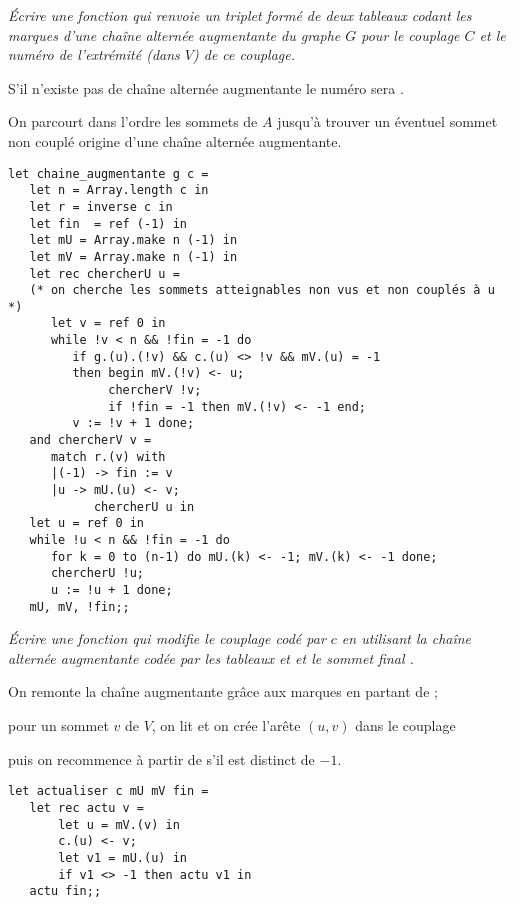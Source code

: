 \begin{Exercise}[title=]\it
Écrire une fonction  qui renvoie un triplet formé de deux tableaux codant les marques d'une chaîne alternée augmentante du graphe $G$ pour le couplage $C$ et le numéro de l'extrémité (dans $V$) de ce couplage.

S'il n'existe pas de chaîne alternée augmentante le numéro sera .
\end{Exercise}
\begin{Answer}
On parcourt dans l'ordre les sommets de $A$ jusqu'à trouver un éventuel sommet non couplé origine d'une chaîne alternée augmentante. 

\begin{lstlisting}
let chaine_augmentante g c =
   let n = Array.length c in
   let r = inverse c in
   let fin  = ref (-1) in
   let mU = Array.make n (-1) in
   let mV = Array.make n (-1) in
   let rec chercherU u =
   (* on cherche les sommets atteignables non vus et non couplés à u *)
      let v = ref 0 in
      while !v < n && !fin = -1 do         
         if g.(u).(!v) && c.(u) <> !v && mV.(u) = -1 
         then begin mV.(!v) <- u;
              chercherV !v;
              if !fin = -1 then mV.(!v) <- -1 end;
         v := !v + 1 done;
   and chercherV v = 
      match r.(v) with
      |(-1) -> fin := v
      |u -> mU.(u) <- v;
            chercherU u in
   let u = ref 0 in
   while !u < n && !fin = -1 do
      for k = 0 to (n-1) do mU.(k) <- -1; mV.(k) <- -1 done;
      chercherU !u;
      u := !u + 1 done;
   mU, mV, !fin;;
\end{lstlisting}
\newpage
\end{Answer}
\begin{Exercise}[title=]\it
Écrire une fonction  qui modifie le couplage codé par $c$ en utilisant la chaîne alternée augmentante codée par les tableaux  et  et le sommet final .
\end{Exercise}
\begin{Answer}

On remonte la chaîne augmentante grâce aux marques en partant de  ; 

pour un sommet $v$ de $V$,  on lit  et on crée l'arête $(u, v)$ dans le couplage 

puis on recommence à partir de  s'il est distinct de $-1$.
\begin{lstlisting}
let actualiser c mU mV fin =
   let rec actu v =
       let u = mV.(v) in
       c.(u) <- v;
       let v1 = mU.(u) in
       if v1 <> -1 then actu v1 in
   actu fin;;
\end{lstlisting}
\end{Answer}
